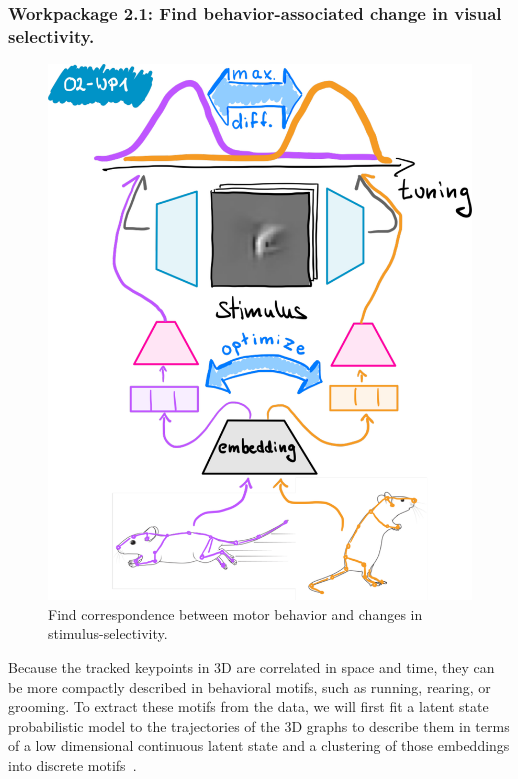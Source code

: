 \documentclass[B2,COG]{ercgrant}
\begin{document}
\subsubsection{Workpackage 2.1: Find behavior-associated change in visual selectivity.\hfill {}}
%
\begin{figure}
\vspace{-3ex}
\includegraphics[width=\linewidth]{figures/o2wp1.pdf}
\caption{Find correspondence between motor behavior and changes in stimulus-selectivity.\label{fig:o2wp1}}
\end{figure}
%
Because the tracked keypoints in 3D are correlated in space and time, they can be more compactly described in behavioral motifs, such as running, rearing, or grooming. 
To extract these motifs from the data, we will first fit a latent state probabilistic model to the trajectories of the 3D graphs to describe them in terms of a low dimensional continuous latent state and a clustering of those embeddings into discrete motifs~\parencite[similar to][]{Wiltschko2015-ey, Wiltschko2020-zd}.
\end{document}
